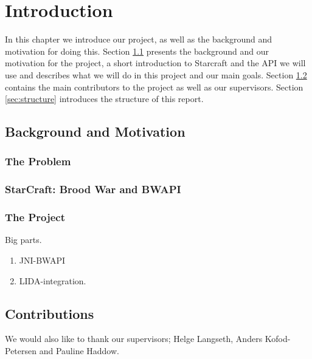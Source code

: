 
\chapter{Introduction}
In this chapter we introduce our project, as well as the background and
motivation for doing this. Section \ref{sec:background} presents the background
and our motivation for the project, a short introduction to Starcraft and the
API we will use and describes what we will do in this project and our main
goals. Section \ref{sec:contributions} contains the main contributors to the
project as well as our supervisors. Section \ref{sec:structure} introduces the
structure of this report.

\section{Background and Motivation}
\label{sec:background}
\subsection{The Problem}

\subsection{StarCraft: Brood War and BWAPI}
\label{sec:scbw}


\subsection{The Project}
\label{sec:project}

Big parts.
\begin{enumerate}
  \item JNI-BWAPI
  \item LIDA-integration.
\end{enumerate}

\section{Contributions}
\label{sec:contributions}
We would also like to thank our supervisors; Helge Langseth, Anders
Kofod-Petersen and Pauline Haddow.


